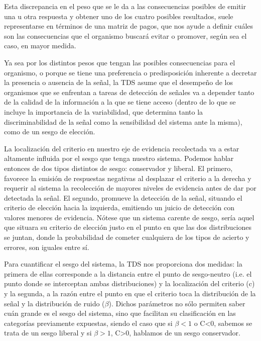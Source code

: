 Esta discrepancia en el peso que se le da a las consecuencias posibles de emitir una u otra respuesta y obtener uno de los cuatro posibles resultados, suele representarse en términos de una matriz de pagos, que nos ayude a definir cuáles son las consecuencias que el organismo buscará evitar o promover, según sea el caso, en mayor medida.

Ya sea por los distintos pesos que tengan las posibles consecuencias para el organismo, o porque se tiene una preferencia o predisposición inherente a decretar la presencia o ausencia de la señal, la TDS asume que el desempeño de los organismos que se enfrentan a tareas de detección de señales va a depender tanto de la calidad de la información a la que se tiene acceso (dentro de lo que se incluye la importancia de la variabilidad, que determina tanto la discriminabilidad de la señal como la sensibilidad del sistema ante la misma), como de un sesgo de elección.

La localización del criterio en nuestro eje de evidencia recolectada va a estar altamente influida por el sesgo que tenga nuestro sistema. Podemos hablar entonces de dos tipos distintos de sesgo: conservador y liberal. El primero, favorece la emisión de respuestas negativas al desplazar el criterio a la derecha y requerir al sistema la recolección de mayores niveles de evidencia antes de dar por detectada la señal. El segundo, promueve la detección de la señal, situando el criterio de elección hacia la izquierda, emitiendo un juicio de detección con valores menores de evidencia. Nótese que un sistema carente de sesgo, sería aquel que situara su criterio de elección justo en el punto en que las dos distribuciones se juntan, donde la probabilidad de cometer cualquiera de los tipos de acierto y errores, son iguales entre sí. 

Para cuantificar el sesgo del sistema, la TDS nos proporciona dos medidas: la primera de ellas corresponde a la distancia entre el punto de sesgo-neutro (i.e. el punto donde se interceptan ambas distribuciones) y la localización del criterio (c) y la segunda, a la razón entre el punto en que el criterio toca la distribución de la señal y la distribución de ruido ($\beta$). Dichos parámetros no sólo permiten saber cuán grande es el sesgo del sistema, sino que facilitan su clasificación en las categorías previamente expuestas, siendo el caso que si $\beta<1$ o C<0, sabemos se trata de un sesgo liberal y si $\beta>1$, C>0, hablamos de un sesgo conservador. 



